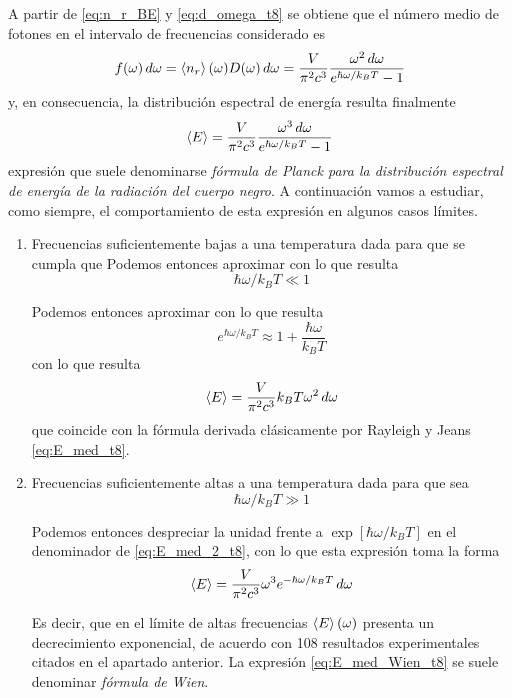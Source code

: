 A partir de \eqref{eq:n_r_BE} y \eqref{eq:d_omega_t8} se obtiene que el número medio de fotones en el intervalo de frecuencias considerado es
\begin{equation}\label{eq:f_omega_t8}
	f(\omega) \dd{\omega} = \expval{n_r}(\omega) D(\omega) \dd{\omega} = \frac{V}{\pi^2 c^3}\frac{\omega^2 \dd{\omega}}{e^{\hbar\omega / k_BT} - 1}
\end{equation}
y, en consecuencia, la distribución espectral de energía resulta finalmente
\begin{equation}\label{eq:E_med_2_t8}
	\expval{E} = \frac{V}{\pi^2 c^3}\frac{\omega^3 \dd{\omega}}{e^{\hbar\omega / k_BT} - 1}
\end{equation}
expresión que suele denominarse \emph{fórmula de Planck para la distribución espectral de energía de la radiación del cuerpo negro}.
A continuación vamos a estudiar, como siempre, el comportamiento de esta expresión en algunos casos límites.
\begin{enumerate}
	\item Frecuencias suficientemente bajas a una temperatura dada para que se cumpla que Podemos entonces aproximar con lo que resulta
	\begin{equation}
		\hbar\omega/k_B T \ll 1
	\end{equation}

	Podemos entonces aproximar con lo que resulta
	\begin{equation}
		e^{\hbar\omega / k_BT} \approx 1 + \frac{\hbar\omega}{k_B T}
	\end{equation}
	con lo que resulta
	\begin{equation}
		\expval{E} = \frac{V}{\pi^2 c^3} k_B T \omega^2 \dd{\omega}
	\end{equation}
	que coincide con la fórmula derivada clásicamente por Rayleigh y Jeans \eqref{eq:E_med_t8}.

	\item Frecuencias suficientemente altas a una temperatura dada para que sea
	\begin{equation}
		\hbar\omega/k_B T \gg 1
	\end{equation}

	Podemos entonces despreciar la unidad frente a $\exp[\hbar\omega / k_BT]$ en el denominador de \eqref{eq:E_med_2_t8}, con lo que esta expresión toma la forma
	\begin{equation}\label{eq:E_med_Wien_t8}
		\expval{E} = \frac{V}{\pi^2 c^3} \omega^3 e^{-\hbar\omega / k_BT} \dd{\omega}
	\end{equation}

	Es decir, que en el límite de altas frecuencias $\expval{E}(\omega)$ presenta un decrecimiento exponencial, de acuerdo con 108 resultados experimentales citados en el apartado anterior.
	La expresión \eqref{eq:E_med_Wien_t8} se suele denominar \emph{fórmula de Wien}.
\end{enumerate}

